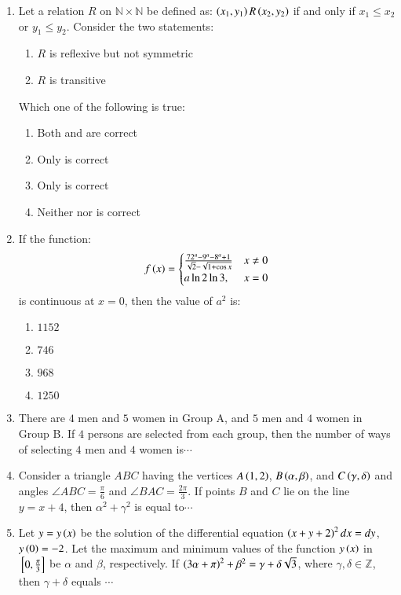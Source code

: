 \documentclass[journal,12pt,twocolumn]{IEEEtran}
\theoremstyle{remark}
\begin{document}
\begin{enumerate}[start=16]
    \item Let a relation $R$ on $\mathbb{N} \times \mathbb{N}$ be defined as: $\left(x_1, y_1\right) R \left(x_2, y_2\right)$ if and only if $x_1 \leq x_2$ or $y_1 \leq y_2$. Consider the two statements:
    \begin{enumerate}
        \item $R$ is reflexive but not symmetric
        \item $R$ is transitive
    \end{enumerate}
    Which one of the following is true:
    \begin{enumerate}
        \item Both  and  are correct
        \item Only  is correct
        \item Only  is correct
        \item Neither  nor  is correct
    \end{enumerate}

    \item If the function:
    $$
		f\left(x\right) = 
    \begin{cases}
    \frac{72^a-9^a-8^a+1}{\sqrt{2}-\sqrt{1+\cos x}} &  x \neq 0 \\
    a\ln{2}\ln{3}, &  x = 0
    \end{cases}
    $$
    is continuous at $x = 0$, then the value of $a^2$ is:
    \begin{enumerate}
        \item $1152$
        \item $746$
        \item $968$
        \item $1250$
    \end{enumerate}

    \item There are $4$ men and $5$ women in Group A, and $5$ men and $4$ women in Group B. If $4$ persons are selected from each group, then the number of ways of selecting $4$ men and $4$ women is$\cdots$
    

    \item Consider a triangle $ABC$ having the vertices $A\left(1, 2\right)$, $B\left(\alpha, \beta\right)$, and $C\left(\gamma, \delta\right)$ and angles $\angle ABC = \frac{\pi}{6}$ and $\angle BAC = \frac{2\pi}{3}$. If points $B$ and $C$ lie on the line $y = x + 4$, then $\alpha^2 + \gamma^2$ is equal to$\cdots$
    

    \item Let $y = y\left(x\right)$ be the solution of the differential equation $\left(x + y + 2\right)^2  dx = dy$, $y\left(0\right) = -2$. Let the maximum and minimum values of the function $y\left(x\right)$ in ${}\left[0, \frac{\pi}{3}\right]$ be $\alpha$ and $\beta$, respectively. If $\left(3\alpha + \pi\right)^2 + \beta^2 = \gamma + \delta\sqrt{3}$, where $\gamma, \delta \in \mathbb{Z}$, then $\gamma + \delta$ equals $\cdots$
    

\end{enumerate}
\end{document}
